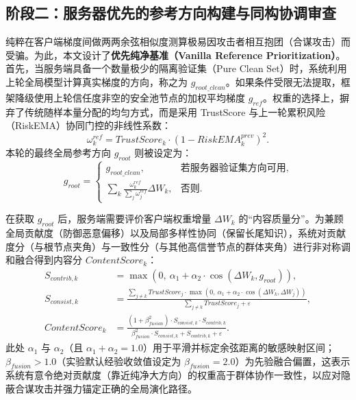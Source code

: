 \documentclass[runningheads]{llncs}
\begin{document}
\subsection{阶段二：服务器优先的参考方向构建与同构协调审查}
纯粹在客户端梯度间做两两余弦相似度测算极易因攻击者相互抱团（合谋攻击）而受骗。为此，本文设计了\textbf{优先纯净基准（Vanilla Reference Prioritization）}。
首先，当服务端具备一个数量极少的隔离验证集（Pure Clean Set）时，系统利用上轮全局模型计算真实梯度的方向，称之为 $g_{root\_clean}$。如果条件受限无法提取，框架降级使用上轮信任度非空的安全池节点的加权平均梯度 $g_{ref}$。权重的选择上，摒弃了传统随样本量分配的均匀方式，而是采用 TrustScore 与上一轮累积风险（RiskEMA）协同门控的非线性系数：
\begin{equation}
    \omega_{k}^{ref} = TrustScore_{k} \cdot (1 - RiskEMA_{k}^{prev})^{2}.
\end{equation}
本轮的最终全局参考方向 $g_{root}$ 则被设定为：
\begin{equation}
    g_{root}=
    \begin{cases}
        g_{root\_clean}, & \text{若服务器验证集方向可用}, \\
        \sum_{k} \frac{\omega_{k}^{ref}}{\sum_j \omega_{j}^{ref}} \Delta W_k, & \text{否则}.
    \end{cases}
\end{equation}

在获取 $g_{root}$ 后，服务端需要评价客户端权重增量 $\Delta W_k$ 的“内容质量分”。为兼顾全局贡献度（防御恶意偏移）以及局部多样性协同（保留长尾知识），系统对贡献度分（与根节点夹角）与一致性分（与其他高信誉节点的群体夹角）进行非对称调和融合得到内容分 $ContentScore_k$：
\begin{align}
    S_{contrib,k} &= \max\left(0,\ \alpha_{1} + \alpha_{2} \cdot \cos(\Delta W_{k}, g_{root})\right), \\
    S_{consist,k} &= \frac{\sum_{j\neq k} TrustScore_{j} \cdot \max\left(0,\ \alpha_{1} + \alpha_{2} \cdot \cos(\Delta W_{k}, \Delta W_{j})\right)}{\sum_{j\neq k} TrustScore_{j} + \varepsilon}, \\
    ContentScore_{k} &= \frac{(1 + \beta_{fusion}^{2}) \cdot S_{consist,k} \cdot S_{contrib,k}}{\beta_{fusion}^{2}\cdot S_{consist,k} + S_{contrib,k} + \varepsilon}.
\end{align}
此处 $\alpha_{1}$ 与 $\alpha_{2}$（且 $\alpha_1 + \alpha_2 = 1.0$）用于平滑并标定余弦距离的敏感映射区间；$\beta_{fusion} > 1.0$（实验默认经验收敛值设定为 $\beta_{fusion}=2.0$）为先验融合偏置，这表示系统有意令绝对贡献度（靠近纯净大方向）的权重高于群体协作一致性，以应对隐蔽合谋攻击并强力锚定正确的全局演化路径。
\end{document}
